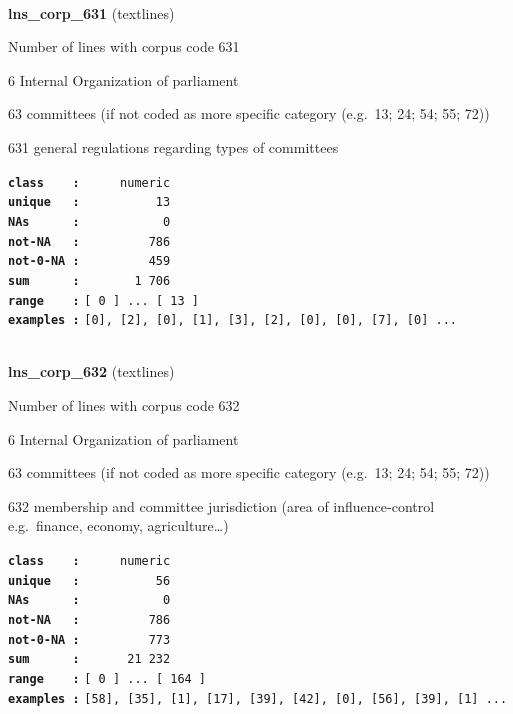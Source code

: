 \documentclass[]{article}
\begin{document}
~

\textbf{lns\_corp\_631} (textlines)

Number of lines with corpus code 631

6 Internal Organization of parliament

63 committees (if not coded as more specific category (e.g.~13; 24; 54;
55; 72))

631 general regulations regarding types of committees

\textbf{\texttt{class\ \ \ \ :}} \texttt{~~~~~numeric}\\
\textbf{\texttt{unique\ \ \ :}} \texttt{~~~~~~~~~~13}\\
\textbf{\texttt{NAs\ \ \ \ \ \ :}} \texttt{~~~~~~~~~~~0}\\
\textbf{\texttt{not-NA\ \ \ :}} \texttt{~~~~~~~~~786}\\
\textbf{\texttt{not-0-NA\ :}} \texttt{~~~~~~~~~459}\\
\textbf{\texttt{sum\ \ \ \ \ \ :}} \texttt{~~~~~~~1~706}\\
\textbf{\texttt{range\ \ \ \ :}}
\texttt{{[}\ 0\ {]}\ ...\ {[}\ 13\ {]}}\\
\textbf{\texttt{examples\ :}}
\texttt{{[}0{]},\ {[}2{]},\ {[}0{]},\ {[}1{]},\ {[}3{]},\ {[}2{]},\ {[}0{]},\ {[}0{]},\ {[}7{]},\ {[}0{]}\ ...}\\

~

\textbf{lns\_corp\_632} (textlines)

Number of lines with corpus code 632

6 Internal Organization of parliament

63 committees (if not coded as more specific category (e.g.~13; 24; 54;
55; 72))

632 membership and committee jurisdiction (area of influence-control
e.g.~finance, economy, agriculture\ldots{})

\textbf{\texttt{class\ \ \ \ :}} \texttt{~~~~~numeric}\\
\textbf{\texttt{unique\ \ \ :}} \texttt{~~~~~~~~~~56}\\
\textbf{\texttt{NAs\ \ \ \ \ \ :}} \texttt{~~~~~~~~~~~0}\\
\textbf{\texttt{not-NA\ \ \ :}} \texttt{~~~~~~~~~786}\\
\textbf{\texttt{not-0-NA\ :}} \texttt{~~~~~~~~~773}\\
\textbf{\texttt{sum\ \ \ \ \ \ :}} \texttt{~~~~~~21~232}\\
\textbf{\texttt{range\ \ \ \ :}}
\texttt{{[}\ 0\ {]}\ ...\ {[}\ 164\ {]}}\\
\textbf{\texttt{examples\ :}}
\texttt{{[}58{]},\ {[}35{]},\ {[}1{]},\ {[}17{]},\ {[}39{]},\ {[}42{]},\ {[}0{]},\ {[}56{]},\ {[}39{]},\ {[}1{]}\ ...}\\
\end{document}
